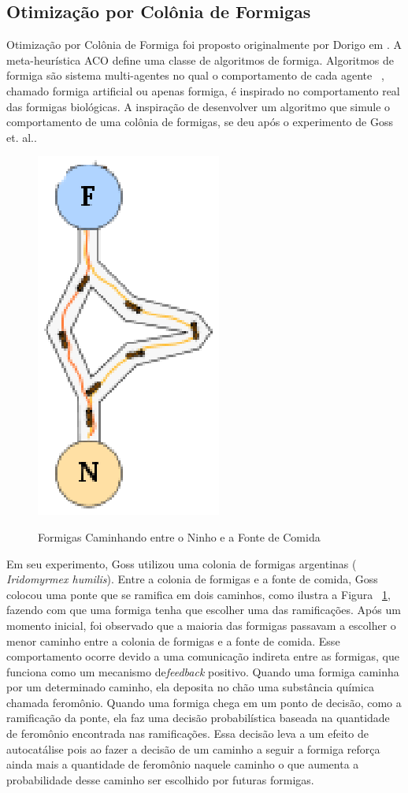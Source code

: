 \subsection{Otimização por Colônia de Formigas}

Otimização por Colônia de Formiga foi proposto originalmente por Dorigo em
\cite{aco-origin}. A meta-heurística ACO define uma classe de algoritmos
de formiga. Algoritmos de formiga são sistema multi-agentes no qual o
comportamento de cada agente ~\cite{aco-origin2}, chamado formiga artificial
ou apenas formiga, é inspirado no comportamento real das formigas biológicas.
A inspiração de desenvolver um algoritmo que simule o comportamento de uma
colônia de formigas, se deu após o experimento de Goss et. al.\cite{Goss}.

\begin{figure}[ht!]
  \centering
  \includegraphics[scale=0.65]{ants}
  \label{fig:ponte}
  \caption{Formigas Caminhando entre o Ninho e a Fonte de Comida}
\end{figure}

Em seu experimento, Goss utilizou uma colonia de formigas argentinas ({\it
Iridomyrmex humilis}). Entre a colonia de formigas e a fonte de comida, Goss
colocou uma ponte que se ramifica em dois caminhos, como ilustra a Figura
~\ref{fig:ponte}, fazendo com que uma formiga tenha que escolher uma das
ramificações. Após um momento inicial, foi observado que a maioria das
formigas passavam a escolher o menor caminho entre a colonia de formigas
e a fonte de comida. Esse comportamento ocorre devido a uma comunicação
indireta entre as formigas, que funciona como um mecanismo de{\it feedback}
positivo. Quando uma formiga caminha por um determinado caminho, ela deposita
no chão uma substância química chamada feromônio. Quando uma formiga
chega em um ponto de decisão, como a ramificação da ponte, ela faz uma
decisão probabilística baseada na quantidade de feromônio encontrada
nas ramificações. Essa decisão leva a um efeito de autocatálise pois
ao fazer a decisão de um caminho a seguir a formiga reforça ainda mais a
quantidade de feromônio naquele caminho o que aumenta a probabilidade desse
caminho ser escolhido por futuras formigas.

